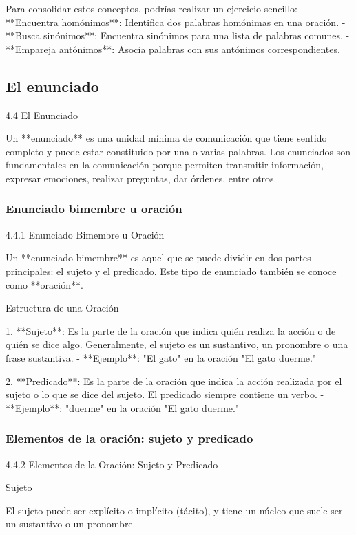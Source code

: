 Para consolidar estos conceptos, podrías realizar un ejercicio sencillo:
- **Encuentra homónimos**: Identifica dos palabras homónimas en una oración.
- **Busca sinónimos**: Encuentra sinónimos para una lista de palabras comunes.
- **Empareja antónimos**: Asocia palabras con sus antónimos correspondientes.

\subsection{El enunciado}

4.4 El Enunciado

Un **enunciado** es una unidad mínima de comunicación que tiene sentido completo y puede estar constituido por una o varias palabras. Los enunciados son fundamentales en la comunicación porque permiten transmitir información, expresar emociones, realizar preguntas, dar órdenes, entre otros.


\subsubsection{Enunciado bimembre u oración}

4.4.1 Enunciado Bimembre u Oración

Un **enunciado bimembre** es aquel que se puede dividir en dos partes principales: el sujeto y el predicado. Este tipo de enunciado también se conoce como **oración**.



Estructura de una Oración

1. **Sujeto**: Es la parte de la oración que indica quién realiza la acción o de quién se dice algo. Generalmente, el sujeto es un sustantivo, un pronombre o una frase sustantiva.
- **Ejemplo**: "El gato" en la oración "El gato duerme."

2. **Predicado**: Es la parte de la oración que indica la acción realizada por el sujeto o lo que se dice del sujeto. El predicado siempre contiene un verbo.
- **Ejemplo**: "duerme" en la oración "El gato duerme."


\subsubsection{Elementos de la oración: sujeto y predicado}

4.4.2 Elementos de la Oración: Sujeto y Predicado

Sujeto

El sujeto puede ser explícito o implícito (tácito), y tiene un núcleo que suele ser un sustantivo o un pronombre.

